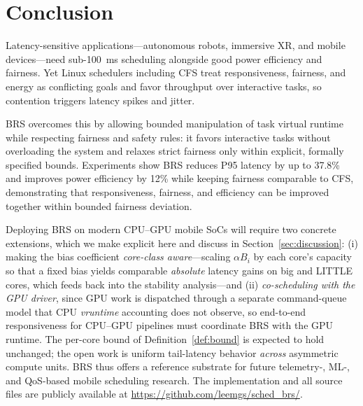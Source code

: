 \section{Conclusion}
\label{sec:conclusion}
Latency-sensitive applications---autonomous robots, immersive XR, and mobile devices---need sub-\SI{100}{\milli\second} scheduling alongside good power efficiency and fairness. Yet Linux schedulers including CFS treat responsiveness, fairness, and energy as conflicting goals and favor throughput over interactive tasks, so contention triggers latency spikes and jitter.

BRS overcomes this by allowing bounded manipulation of task virtual runtime while respecting fairness and safety rules: it favors interactive tasks without overloading the system and relaxes strict fairness only within explicit, formally specified bounds. Experiments show BRS reduces P95 latency by up to 37.8\% and improves power efficiency by 12\% while keeping fairness comparable to CFS, demonstrating that responsiveness, fairness, and efficiency can be improved together within bounded fairness deviation.

Deploying BRS on modern CPU--GPU mobile SoCs will require two concrete extensions, which we make explicit here and discuss in Section~\ref{sec:discussion}: (i) making the bias coefficient \emph{core-class aware}---scaling $\alpha B_i$ by each core's capacity so that a fixed bias yields comparable \emph{absolute} latency gains on big and LITTLE cores, which feeds back into the stability analysis---and (ii) \emph{co-scheduling with the GPU driver}, since GPU work is dispatched through a separate command-queue model that CPU \textit{vruntime} accounting does not observe, so end-to-end responsiveness for CPU--GPU pipelines must coordinate BRS with the GPU runtime. The per-core bound of Definition~\ref{def:bound} is expected to hold unchanged; the open work is uniform tail-latency behavior \emph{across} asymmetric compute units. BRS thus offers a reference substrate for future telemetry-, ML-, and QoS-based mobile scheduling research. The implementation and all source files are publicly available at \url{https://github.com/leemgs/sched_brs/}.
